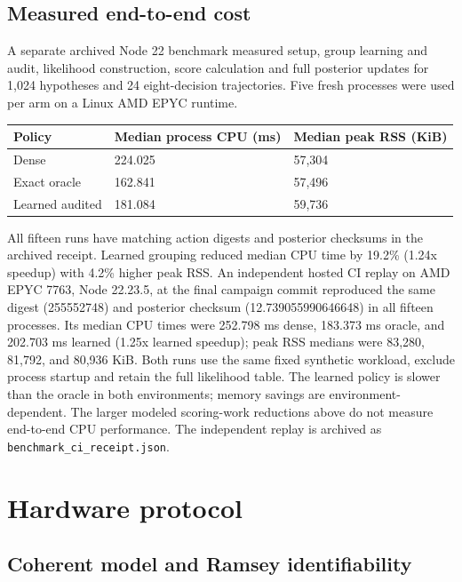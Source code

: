 \documentclass[11pt,a4paper]{article}
\begin{document}
\subsection{Measured end-to-end cost}

A separate archived Node 22 benchmark measured setup, group learning and audit, likelihood construction, score calculation and full posterior updates for 1,024 hypotheses and 24 eight-decision trajectories. Five fresh processes were used per arm on a Linux AMD EPYC runtime.

\begin{center}
\centering
\normalsize
\begin{tabularx}{\linewidth}{@{}YYY@{}}
\toprule
Policy & Median process CPU (ms) & Median peak RSS (KiB) \\
\midrule
Dense & 224.025 & 57,304 \\
Exact oracle & 162.841 & 57,496 \\
Learned audited & 181.084 & 59,736 \\
\bottomrule
\end{tabularx}
\end{center}

All fifteen runs have matching action digests and posterior checksums in the archived receipt. Learned grouping reduced median CPU time by 19.2\% (1.24x speedup) with 4.2\% higher peak RSS. An independent hosted CI replay on AMD EPYC 7763, Node 22.23.5, at the final campaign commit reproduced the same digest (255552748) and posterior checksum (12.739055990646648) in all fifteen processes. Its median CPU times were 252.798 ms dense, 183.373 ms oracle, and 202.703 ms learned (1.25x learned speedup); peak RSS medians were 83,280, 81,792, and 80,936 KiB. Both runs use the same fixed synthetic workload, exclude process startup and retain the full likelihood table. The learned policy is slower than the oracle in both environments; memory savings are environment-dependent. The larger modeled scoring-work reductions above do not measure end-to-end CPU performance. The independent replay is archived as \texttt{benchmark\_ci\_receipt.json}.

\section{Hardware protocol}

\subsection{Coherent model and Ramsey identifiability}
\end{document}
